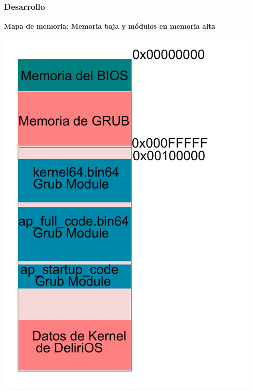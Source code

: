 \documentclass{beamer}
\begin{document}
\begin{frame}
  \frametitle{Desarrollo}
  \framesubtitle{Mapa de memoria: Memoria baja y módulos en memoria alta} %
  \begin{center}
  \includegraphics[scale=0.23]{images/modules-map.pdf} 
  \end{center}
\end{frame}
\end{document}
